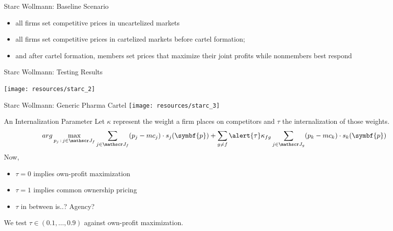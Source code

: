 \documentclass[aspectratio=169,10pt]{beamer}
\begin{document}
\begin{frame}{Starc Wollmann: Baseline Scenario }
\begin{itemize}
\item all firms set competitive prices in uncartelized markets
\item all firms set competitive prices in cartelized markets before cartel formation;
\item  and after cartel formation, members set prices that maximize their joint profits while nonmembers best respond
\end{itemize}
\end{frame}

\begin{frame}{Starc Wollmann: Testing Results }
\begin{center}
\texttt{[image: resources/starc\_2]}
\end{center}
\end{frame}

\begin{frame}{Starc Wollmann: Generic Pharma Cartel }
\texttt{[image: resources/starc\_3]}
\end{frame}




\begin{frame}[plain]{An Internalization Parameter}
Let $\kappa$ represent the weight a firm places on competitors and $\tau$ the internalization of those weights.
 \begin{equation*}
 arg\max_{p_j \,:\, j \in \calJ_f} \sum_{j \in \calJ_f} (p_j - mc_j) \cdot s_j(\symbf{p})+
 \sum_{g\neq f} \alert{\tau} \kappa_{fg} \sum_{j \in \calJ_g} (p_k - mc_k) \cdot s_k(\symbf{p})
 \end{equation*}
Now, 
\begin{itemize}
\item $\tau = 0$ implies own-profit maximization
\item $\tau = 1$ implies common ownership pricing
\item $\tau$ in between is..? Agency?
\end{itemize}
We test $\tau \in (0.1, \ldots, 0.9)$ against own-profit maximization.
\end{frame}
\end{document}
